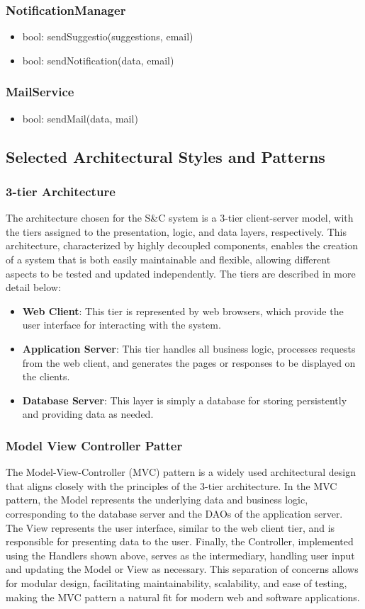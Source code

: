 \subsubsection{NotificationManager}
\begin{itemize}
    \item bool: sendSuggestio(suggestions, email)
    \item bool: sendNotification(data, email)
\end{itemize}
\subsubsection{MailService}
\begin{itemize}
    \item bool: sendMail(data, mail)
\end{itemize}

\subsection{Selected Architectural Styles and Patterns}
\subsubsection{3-tier Architecture}
The architecture chosen for the S\&C system is a 3-tier client-server model, with the tiers assigned to the presentation, logic, and data layers, respectively. This architecture, characterized by highly decoupled components, enables the creation of a system that is both easily maintainable and flexible, allowing different aspects to be tested and updated independently. The tiers are described in more detail below:
\begin{itemize}
    \item \textbf{Web Client}: This tier is represented by web browsers, which provide the user interface for interacting with the system.
    \item \textbf{Application Server}: This tier handles all business logic, processes requests from the web client, and generates the pages or responses to be displayed on the clients.
    \item \textbf{Database Server}: This layer is simply a database for storing persistently and providing data as needed.
\end{itemize}
\subsubsection{Model View Controller Patter}
The Model-View-Controller (MVC) pattern is a widely used architectural design that aligns closely with the principles of the 3-tier architecture. In the MVC pattern, the Model represents the underlying data and business logic, corresponding to the database server and the DAOs of the application server. The View represents the user interface, similar to the web client tier, and is responsible for presenting data to the user. Finally, the Controller, implemented using the Handlers shown above, serves as the intermediary, handling user input and updating the Model or View as necessary. This separation of concerns allows for modular design, facilitating maintainability, scalability, and ease of testing, making the MVC pattern a natural fit for modern web and software applications.
